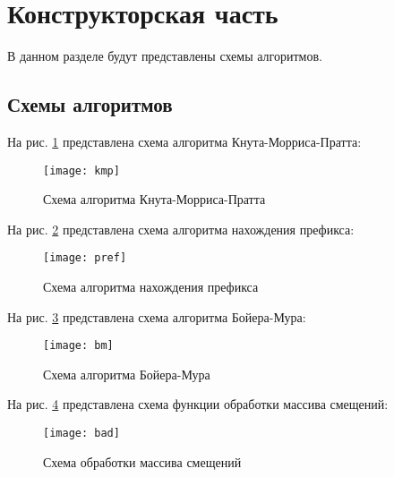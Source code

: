 \documentclass[a4paper, 14pt]{article}
\begin{document}
	\newpage
	\section{Конструкторская часть}
	
	В данном разделе будут представлены схемы алгоритмов.
	
	\subsection{Схемы алгоритмов}
	
	На рис. \ref{fig:kmp} представлена схема алгоритма Кнута-Морриса-Пратта:
    
    \begin{figure}[H]
        	\begin{center}
        		\texttt{[image: kmp]}
        		\caption{Схема алгоритма Кнута-Морриса-Пратта}
        		\label{fig:kmp}
        	\end{center}
        \end{figure}
        
        На рис. \ref{fig:pref} представлена схема алгоритма нахождения префикса:
    
    \begin{figure}[H]
        	\begin{center}
        		\texttt{[image: pref]}
        		\caption{Схема алгоритма нахождения префикса}
        		\label{fig:pref}
        	\end{center}
        \end{figure}
       
       \newpage
      На рис. \ref{fig:bm} представлена схема алгоритма Бойера-Мура:
    
    \begin{figure}[H]
        	\begin{center}
        		\texttt{[image: bm]}
        		\caption{Схема алгоритма Бойера-Мура}
        		\label{fig:bm}
        	\end{center}
        \end{figure}
        
        \newpage
          На рис. \ref{fig:bad} представлена схема функции обработки массива смещений:
    
    \begin{figure}[H]
        	\begin{center}
        		\texttt{[image: bad]}
        		\caption{Схема обработки массива смещений}
        		\label{fig:bad}
        	\end{center}
        \end{figure}
\end{document}
